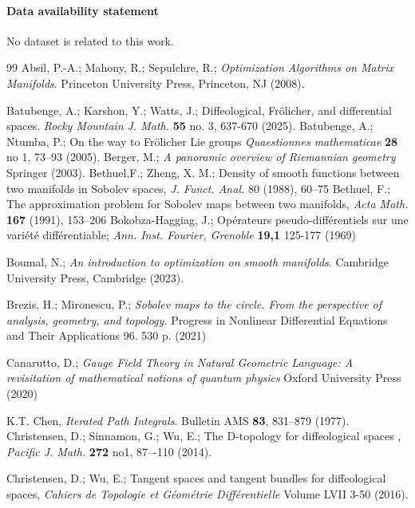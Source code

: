 \documentclass{amsart}
\newcounter{thm}
\newcounter{ex}
\newcounter{re}
\begin{document}
\paragraph{\bf Data availability statement} No dataset is related to this work. 
\begin{thebibliography}{99}
 {\color{blue} Absil, P.-A.; Mahony, R.; Sepulchre, R.; \emph{Optimization Algorithms on Matrix Manifolds}. Princeton University Press, Princeton, NJ (2008).}
 
 Batubenge, A.; Karshon, Y.; Watts, J.; Diffeological, Frölicher, and differential spaces. \emph{Rocky Mountain J. Math.} {\bf 55} no. 3, 637-670 (2025).
 Batubenge, A.; Ntumba, P.; On the way to Fr\"olicher Lie groups
\textit{Quaestionnes mathematicae}  \textbf{28} no 1, 73--93 (2005).
 Berger, M.; \textit{A panoramic overview of Riemannian geometry} Springer (2003).
{\color{black}  Bethuel,F.;  Zheng, X. M.; Density of smooth functions between two manifolds in Sobolev spaces, \emph{J.
Funct. Anal.} 80 (1988), 60–75
 Bethuel, F.; The approximation problem for Sobolev maps between two manifolds, \emph{Acta Math.} {\bf 167} (1991), 153–206}
  Bokobza-Haggiag, J.; { Op\'erateurs pseudo-diff\'erentiels sur une vari\'et\'e diff\'erentiable}; {\it Ann. Inst. Fourier, Grenoble} \textbf{19,1}  125-177 (1969)

 {\color{blue}Boumal, N.; \emph{An introduction to optimization on smooth manifolds}. Cambridge University Press, Cambridge (2023).}

 Brezis, H.; Mironescu, P.;
\emph{Sobolev maps to the circle. From the perspective of analysis, geometry, and topology.}
Progress in Nonlinear Differential Equations and Their Applications 96. 530 p. (2021)

 Canarutto, D.; \emph{Gauge Field Theory in Natural Geometric Language: A revisitation of mathematical notions of quantum physics} Oxford University Press (2020)

 K.T. Chen, \emph{Iterated Path Integrals}. Bulletin AMS \textbf{83}, 831--879 (1977).
  Christensen, D.; Sinnamon, G.; Wu, E.; 
The
{D-topology}  for  diffeological  spaces
,  \textit{Pacific  J.  Math.}
\textbf{272}
no1,
87–-110 (2014).

 Christensen, D.; Wu, E.; Tangent spaces and tangent bundles for
diffeological spaces, \emph{Cahiers de Topologie et G\'eom\'etrie Diff\'erentielle} Volume LVII 3-50 (2016).


\end{thebibliography}
\end{document}

